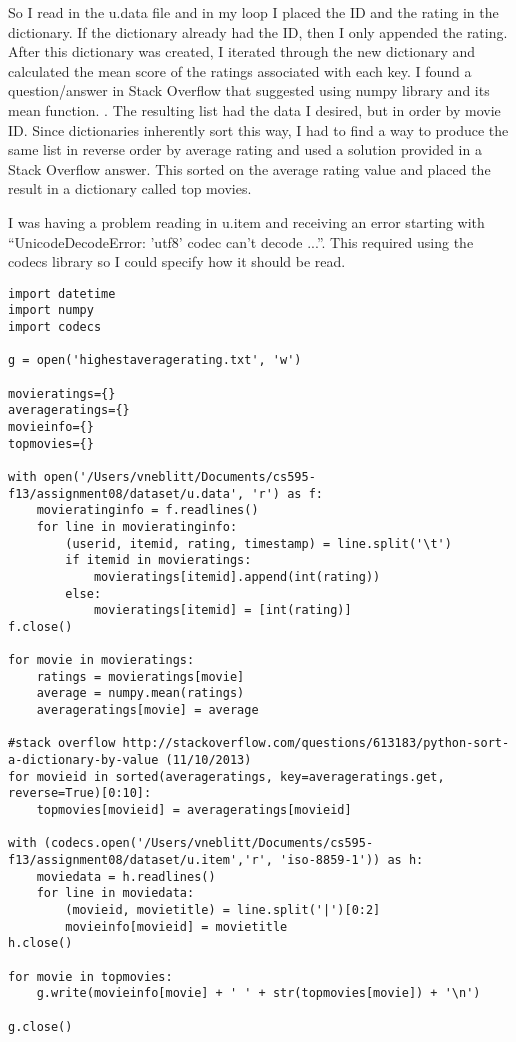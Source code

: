 \documentclass{article}
\begin{document}
So I read in the u.data file and in my loop I placed the ID and the rating in the dictionary. If the dictionary already had the ID, then I only appended the rating. After this dictionary was created, I iterated through the new dictionary and calculated the mean score of the ratings associated with each key. I found a question/answer in Stack Overflow that suggested using numpy library and its mean function. \cite{numpymean}. The resulting list had the data I desired, but in order by movie ID. Since dictionaries inherently sort this way, I had to find a way to produce the same list in reverse order by average rating and used a solution provided in a Stack Overflow answer. \cite{dictsortvalue} This sorted on the average rating value and placed the result in a dictionary called top movies.

I was having a problem reading in u.item and receiving an error starting with ``UnicodeDecodeError: 'utf8' codec can't decode ...''. This required using the codecs library \cite{codecs} so I could specify how it should be read.

\begin{lstlisting}[frame=single, caption=highestavgrating.py, label=highaverage]
import datetime
import numpy
import codecs

g = open('highestaveragerating.txt', 'w')

movieratings={}
averageratings={}
movieinfo={}
topmovies={}

with open('/Users/vneblitt/Documents/cs595-f13/assignment08/dataset/u.data', 'r') as f:
	movieratinginfo = f.readlines()
	for line in movieratinginfo:
		(userid, itemid, rating, timestamp) = line.split('\t')
		if itemid in movieratings:
			movieratings[itemid].append(int(rating))
		else:
			movieratings[itemid] = [int(rating)]
f.close()

for movie in movieratings:
	ratings = movieratings[movie]
	average = numpy.mean(ratings)
	averageratings[movie] = average

#stack overflow http://stackoverflow.com/questions/613183/python-sort-a-dictionary-by-value (11/10/2013)
for movieid in sorted(averageratings, key=averageratings.get, reverse=True)[0:10]:
	topmovies[movieid] = averageratings[movieid]

with (codecs.open('/Users/vneblitt/Documents/cs595-f13/assignment08/dataset/u.item','r', 'iso-8859-1')) as h:
	moviedata = h.readlines()
	for line in moviedata:
		(movieid, movietitle) = line.split('|')[0:2]
		movieinfo[movieid] = movietitle
h.close()

for movie in topmovies:
	g.write(movieinfo[movie] + ' ' + str(topmovies[movie]) + '\n')

g.close()
\end{lstlisting}
\end{document}
